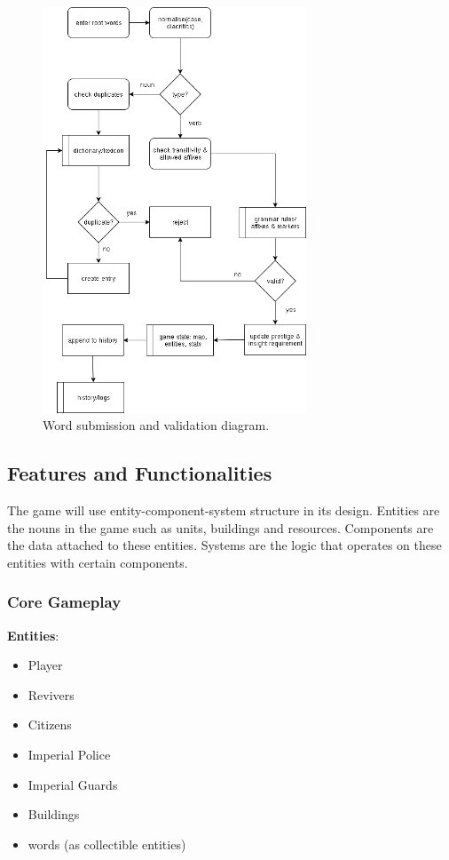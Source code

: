 \documentclass[11pt]{article}
\begin{document}
\begin{figure}[H]
  \centering
  \includegraphics[width=0.7\textwidth]{images/dfd2a.png}
  \caption{Word submission and validation diagram.}
  \label{fig:dfd2a}
\end{figure}

\subsection{Features and Functionalities}
The game will use entity-component-system structure in its design. Entities are the nouns in the game such as units, buildings and resources. Components are the data attached to these entities. Systems are the logic that operates on these entities with certain components.

\subsubsection{Core Gameplay}
\textbf{Entities}:
\begin{itemize}
\item
  Player
\item
  Revivers
\item
  Citizens
\item
  Imperial Police
\item
  Imperial Guards
\item Buildings
\item
  words (as collectible entities)
\end{itemize}
\end{document}
